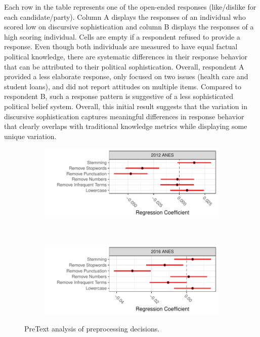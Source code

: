 \documentclass[12pt]{article}
\begin{document}
Each row in the table represents one of the open-ended responses (like/dislike for each candidate/party). Column A displays the responses of an individual who scored low on discursive sophistication and column B displays the responses of a high scoring individual. Cells are empty if a respondent refused to provide a response. Even though both individuals are measured to have equal factual political knowledge, there are systematic differences in their response behavior that can be attributed to their political sophistication. Overall, respondent A provided a less elaborate response, only focused on two issues (health care and student loans), and did not report attitudes on multiple items. Compared to respondent B, such a response pattern is suggestive of a less sophisticated political belief system. Overall, this initial result suggests that the variation in discursive sophistication captures meaningful differences in response behavior that clearly overlaps with traditional knowledge metrics while displaying some unique variation.


\begin{figure}[t!]
    \centering
    \begin{subfigure}[t]{1\textwidth}
        \centering
        \includegraphics{../fig/pretext2012.pdf}
    \end{subfigure}%
    \\
    \begin{subfigure}[t]{1\textwidth}
        \centering
        \includegraphics{../fig/pretext2016.pdf}
    \end{subfigure}
    \caption{PreText analysis of preprocessing decisions.}\label{fig:pretext}
\end{figure}
\end{document}
